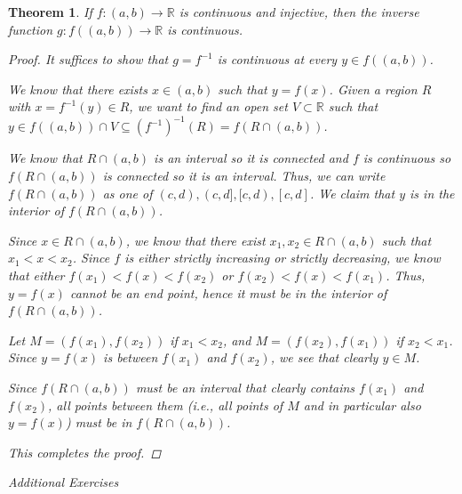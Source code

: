 \documentclass[11pt]{article}
\newcommand{\bbR}{\mathbb{R}}
\renewcommand{\_}[1]{\underline{ #1 }}
\newtheorem{theorem}{Theorem}[section]
\theoremstyle{definition}
\numberwithin{equation}{subsection}
\begin{document}
\begin{theorem}\label{invfun}
If $f\colon (a,b)\to\bbR$ is continuous and injective, then the inverse function $g\colon f((a,b))\to \bbR$ is continuous.

\begin{proof}
It suffices to show that $g=f^{-1}$ is continuous at every $y \in f((a,b))$. 

We know that there exists $x \in (a,b)$ such that $y=f(x)$. Given a region $R$ with $x = f^{-1}(y) \in R$, we want to find an open set $V \subset \bbR$ such that $y \in f((a,b))\cap V \subseteq (f^{-1})^{-1}(R)=f(R \cap (a,b))$. 

We know that $R\cap (a,b)$ is an interval so it is connected and $f$ is continuous so $f(R\cap (a,b))$ is connected so it is an interval. Thus, we can write $f(R\cap (a,b))$ as one of $(c,d), (c,d], [c,d), [c,d]$. We claim that $y$ is in the interior of $f(R\cap (a,b))$. 

Since $x \in R\cap (a,b)$, we know that there exist $x_1, x_2 \in R \cap (a,b)$ such that $x_1<x<x_2$. Since $f$ is either strictly increasing or strictly decreasing, we know that either $f(x_1)<f(x)<f(x_2)$ or $f(x_2)<f(x)<f(x_1)$. Thus, $y=f(x)$ cannot be an end point, hence it must be in the interior of $f(R\cap (a,b))$. 

Let $M=(f(x_1),f(x_2))$ if $x_1<x_2$, and $M = (f(x_2),f(x_1))$ if $x_2<x_1$. Since $y=f(x)$ is between $f(x_1)$ and $f(x_2)$, we see that clearly $y \in M$. 

Since $f(R\cap (a,b))$ must be an interval that clearly contains $f(x_1)$ and $f(x_2)$, all points between them (i.e., all points of $M$ and in particular also $y=f(x)$) must be in $f(R\cap (a,b))$.

This completes the proof.

\renewcommand\qedsymbol{QED}
\end{proof}


\end{theorem}



\bigskip

\begin{center}
{\em Additional Exercises}
\end{center}
\end{document}
